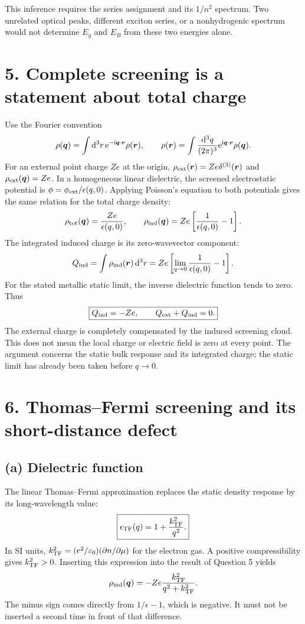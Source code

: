 \begin{center}
\end{center}
This inference requires the series assignment and its $1/n^2$ spectrum. Two unrelated optical peaks, different exciton series, or a nonhydrogenic spectrum would not determine $E_g$ and $E_B$ from these two energies alone.

\section*{5. Complete screening is a statement about total charge}
Use the Fourier convention
\[
\rho(\boldsymbol{q})=\int\mathop{}\!\mathrm{d}^3r\,\mathrm{e}^{-\mathrm{i}\boldsymbol{q}\cdot\boldsymbol{r}}\rho(\boldsymbol{r}),
\qquad
\rho(\boldsymbol{r})=\int\frac{\mathop{}\!\mathrm{d}^3q}{(2\pi)^3}
\mathrm{e}^{\mathrm{i}\boldsymbol{q}\cdot\boldsymbol{r}}\rho(\boldsymbol{q}).
\]
For an external point charge $Ze$ at the origin,
$\rho_{\rm ext}(\boldsymbol{r})=Ze\delta^{(3)}(\boldsymbol{r})$ and
$\rho_{\rm ext}(\boldsymbol{q})=Ze$. In a homogeneous linear dielectric, the screened electrostatic potential is $\phi=\phi_{\rm ext}/\epsilon(q,0)$. Applying Poisson's equation to both potentials gives the same relation for the total charge density:
\[
\rho_{\rm tot}(\boldsymbol{q})=\frac{Ze}{\epsilon(q,0)},\qquad
\rho_{\rm ind}(\boldsymbol{q})=Ze\left[\frac1{\epsilon(q,0)}-1\right].
\]
The integrated induced charge is its zero-wavevector component:
\[
Q_{\rm ind}=\int\rho_{\rm ind}(\boldsymbol{r})\mathop{}\!\mathrm{d}^3r
=Ze\left[\lim_{q\to0}\frac1{\epsilon(q,0)}-1\right].
\]
For the stated metallic static limit, the inverse dielectric function tends to zero. Thus
\[
\boxed{Q_{\rm ind}=-Ze,\qquad Q_{\rm ext}+Q_{\rm ind}=0.}
\]
The external charge is completely compensated by the induced screening cloud. This does not mean the local charge or electric field is zero at every point. The argument concerns the static bulk response and its integrated charge; the static limit has already been taken before $q\to0$.

\section*{6. Thomas--Fermi screening and its short-distance defect}
\subsection*{(a) Dielectric function}
The linear Thomas--Fermi approximation replaces the static density response by its long-wavelength value:
\[
\boxed{\epsilon_{\rm TF}(q)=1+\frac{k_{\rm TF}^2}{q^2}.}
\]
In SI units, $k_{\rm TF}^2=(e^2/\varepsilon_0)(\partial n/\partial\mu)$ for the electron gas. A positive compressibility gives $k_{\rm TF}^2>0$. Inserting this expression into the result of Question 5 yields
\[
\rho_{\rm ind}(\boldsymbol{q})=-Ze\frac{k_{\rm TF}^2}{q^2+k_{\rm TF}^2}.
\]
The minus sign comes directly from $1/\epsilon-1$, which is negative. It must not be inserted a second time in front of that difference.

